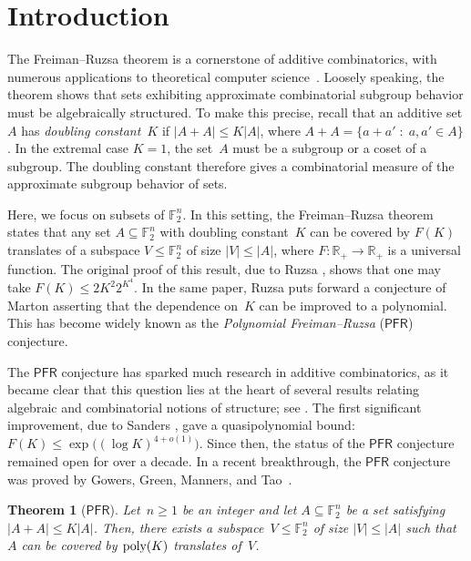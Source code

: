 \documentclass[11pt]{amsart}
\newcommand{\R}{\mathbb{R}} %
\newcommand{\F}{\mathbb{F}} %
\newcommand{\PFR}{\textsf{PFR}}
\newcommand{\poly}{\mbox{\rm poly}}
\theoremstyle{plain}
\newtheorem{theorem}{Theorem}[section]
\theoremstyle{definition}
\theoremstyle{remark}
\begin{document}
\section{Introduction}

The Freiman--Ruzsa theorem \cite{freiman1987structure,ruzsa1999analog} is a cornerstone of additive combinatorics,
with numerous applications to theoretical computer science~\cite{lovett2015exposition}.
Loosely speaking, the theorem shows that sets exhibiting approximate combinatorial subgroup behavior must be algebraically structured.
To make this precise, recall that an additive set $A$ has \emph{doubling constant}~$K$ if $|A+A|\le K|A|$, where  $A+A = \{a+a' \;:\; a,a' \in A\}$.
In the extremal case $K=1$, the set~$A$ must be a subgroup or a coset of a subgroup.
The doubling constant therefore gives a combinatorial measure of the approximate subgroup behavior of sets.

Here, we focus on subsets of $\mathbb{F}_2^n$.
In this setting, the Freiman--Ruzsa theorem states that any set $A \subseteq \F_2^n$ with doubling constant~$K$ can be covered by $F(K)$ translates of a subspace $V \leq \F_2^n$ of size $|V| \leq |A|$, where $F: \R_+ \to \R_+$ is a universal function.
The original proof of this result, due to Ruzsa \cite{ruzsa1999analog}, shows that one may take $F(K) \leq 2K^2 2^{K^4}$.
In the same paper, Ruzsa puts forward a conjecture of Marton asserting that the dependence on~$K$ can be improved to a polynomial.
This has become widely known as the \emph{Polynomial Freiman--Ruzsa} ($\PFR$) conjecture.

The $\PFR$ conjecture has sparked much research in additive combinatorics, as it became clear that this question lies at the heart of several results relating algebraic and combinatorial notions of structure; see \cite{green2004finite, green2005notes}.
The first significant improvement, due to Sanders \cite{Sanders2012}, gave a quasipolynomial bound:
$F(K) \leq \exp\big((\log K)^{4+o(1)}\big)$.
Since then, the status of the $\PFR$ conjecture remained open for over a decade.
In a recent breakthrough, the $\PFR$ conjecture was proved by Gowers, Green, Manners, and Tao~\cite{GowersGMT2025}.

\begin{theorem}[$\PFR$]
\label{thm:marton_conjecture}
    Let~$n\geq 1$ be an integer and let $A \subseteq \F_2^{n}$ be a set satisfying $|A + A| \leq K |A|$. 
    Then, there exists a subspace~$V \leq \F_2^n$ of size $|V|\leq |A|$ such that~$A$ can be covered by $\poly(K)$ translates of~$V$.
\end{theorem}
\end{document}
